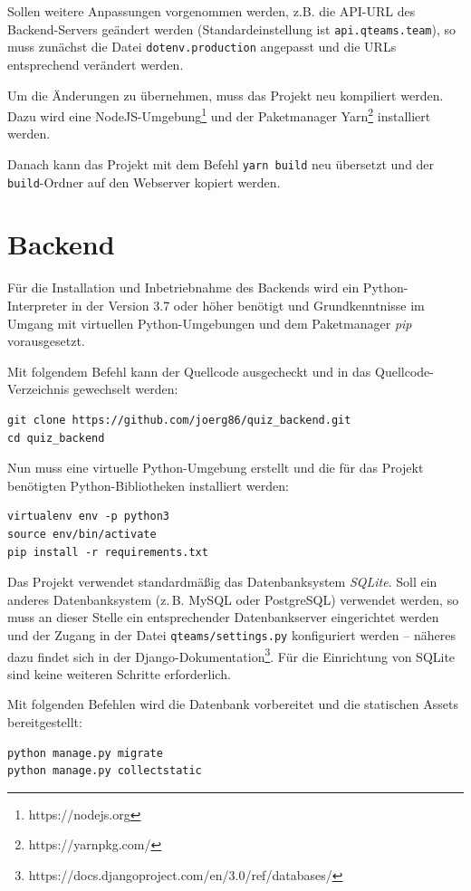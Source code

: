 \documentclass[a4paper,11pt,listof=numbered,glossary=totoc,parskip=half,toc=bib]{scrreprt}
\begin{document}
\begin{appendices}
	Sollen weitere Anpassungen vorgenommen werden, z.B. die API-URL des Backend-Servers geändert werden (Standardeinstellung ist \texttt{api.qteams.team}), so muss zunächst die Datei \texttt{dotenv.production} angepasst und die URLs entsprechend verändert werden.
	
	Um die Änderungen zu übernehmen, muss das Projekt neu kompiliert werden. Dazu wird eine NodeJS-Umgebung\footnote{https://nodejs.org} und der Paketmanager Yarn\footnote{https://yarnpkg.com/} installiert werden.
	
	Danach kann das Projekt mit dem Befehl \texttt{yarn build} neu übersetzt und der \texttt{build}-Ordner auf den Webserver kopiert werden.
	
	\section{Backend}
	Für die Installation und Inbetriebnahme des Backends wird ein Python-Interpreter in der Version 3.7 oder höher benötigt und Grundkenntnisse im Umgang mit virtuellen Python-Umgebungen und dem Paketmanager \textit{pip} vorausgesetzt.
	
	Mit folgendem Befehl kann der Quellcode ausgecheckt und in das Quellcode-Verzeichnis gewechselt werden:		
	\begin{verbatim}
git clone https://github.com/joerg86/quiz_backend.git
cd quiz_backend
	\end{verbatim}
	
	Nun muss eine virtuelle Python-Umgebung erstellt und die für das Projekt benötigten Python-Bibliotheken installiert werden:
	\begin{verbatim}
virtualenv env -p python3
source env/bin/activate
pip install -r requirements.txt
	\end{verbatim}
	
	Das Projekt verwendet standardmäßig das Datenbanksystem \textit{SQLite}. Soll ein anderes Datenbanksystem (z.\,B. MySQL oder PostgreSQL) verwendet werden, so muss an dieser Stelle ein entsprechender Datenbankserver eingerichtet werden und der Zugang in der Datei \texttt{qteams/settings.py} konfiguriert werden -- näheres dazu findet sich in der Django-Dokumentation\footnote{https://docs.djangoproject.com/en/3.0/ref/databases/}. Für die Einrichtung von SQLite sind keine weiteren Schritte erforderlich.
	
	Mit folgenden Befehlen wird die Datenbank vorbereitet und die statischen Assets bereitgestellt:
	
	\begin{verbatim}
python manage.py migrate
python manage.py collectstatic
	\end{verbatim}
	

\end{appendices}
\end{document}
